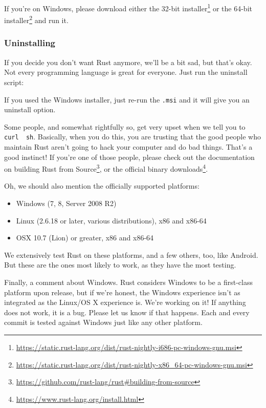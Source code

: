 \documentclass[a4paper,]{book}
\newenvironment{Shaded}{\begin{snugshade}}{\end{snugshade}}
\newcommand{\KeywordTok}[1]{\textcolor[rgb]{0.13,0.29,0.53}{\textbf{{#1}}}}
\newcommand{\NormalTok}[1]{{#1}}
\renewcommand{\href}[2]{#2\footnote{\url{#1}}}
\providecommand{\tightlist}{%
  \setlength{\itemsep}{0pt}\setlength{\parskip}{0pt}}
\begin{document}
If you're on Windows, please download either the
\href{https://static.rust-lang.org/dist/rust-nightly-i686-pc-windows-gnu.msi}{32-bit
installer} or the
\href{https://static.rust-lang.org/dist/rust-nightly-x86_64-pc-windows-gnu.msi}{64-bit
installer} and run it.

\subsubsection{Uninstalling}\label{uninstalling-1}

If you decide you don't want Rust anymore, we'll be a bit sad, but
that's okay. Not every programming language is great for everyone. Just
run the uninstall script:

\begin{Shaded}
\end{Shaded}

If you used the Windows installer, just re-run the \texttt{.msi} and it
will give you an uninstall option.

Some people, and somewhat rightfully so, get very upset when we tell you
to \texttt{curl\ \textbar{}\ sh}. Basically, when you do this, you are
trusting that the good people who maintain Rust aren't going to hack
your computer and do bad things. That's a good instinct! If you're one
of those people, please check out the documentation on
\href{https://github.com/rust-lang/rust\#building-from-source}{building
Rust from Source}, or \href{https://www.rust-lang.org/install.html}{the
official binary downloads}.

Oh, we should also mention the officially supported platforms:

\begin{itemize}
\tightlist
\item
  Windows (7, 8, Server 2008 R2)
\item
  Linux (2.6.18 or later, various distributions), x86 and x86-64
\item
  OSX 10.7 (Lion) or greater, x86 and x86-64
\end{itemize}

We extensively test Rust on these platforms, and a few others, too, like
Android. But these are the ones most likely to work, as they have the
most testing.

Finally, a comment about Windows. Rust considers Windows to be a
first-class platform upon release, but if we're honest, the Windows
experience isn't as integrated as the Linux/OS X experience is. We're
working on it! If anything does not work, it is a bug. Please let us
know if that happens. Each and every commit is tested against Windows
just like any other platform.
\end{document}
